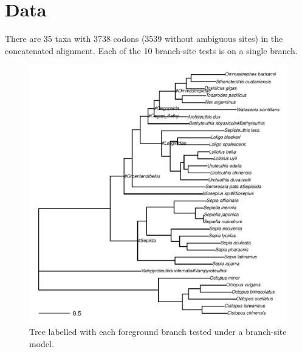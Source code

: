 \documentclass[12pt,letterpaper]{article}\usepackage[]{graphicx}\usepackage[]{color}
\makeatletter
\def\maxwidth{ %
  \ifdim\Gin@nat@width>\linewidth
    \linewidth
  \else
    \Gin@nat@width
  \fi
}
\newenvironment{knitrout}{}{} %
\makeatother
\begin{document}
\section*{Data}
There are 35 taxa with 3738 codons (3539 without ambiguous sites) in the
concatenated alignment.  Each of the 10 branch-site tests is on a single branch.

\begin{figure}[h!]
\begin{knitrout}
\color{fgcolor}

{\centering \includegraphics[width=\maxwidth]{./figures/tree-1} 

}



\end{knitrout}
  \caption[]{Tree labelled with each foreground branch tested under a branch-site model.}
  \label{fig:ceph_tree}
\end{figure}

\clearpage
\end{document}

